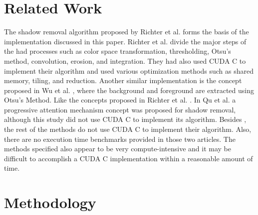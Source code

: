\documentclass[conference]{IEEEtran}
\begin{document}
   \section{Related Work}
      The shadow removal algorithm proposed by Richter et al. \cite{Akoglu} forms the basis of the implementation discussed in this paper. Richter et al. divide the major steps of the had processes such as color space transformation, thresholding, Otsu’s method, convolution, erosion, and integration. They had also used CUDA C to implement their algorithm and used various optimization methods such as shared memory, tiling, and reduction. Another similar implementation is the concept proposed in Wu et al. \cite{Wu2020}, where the background and foreground are extracted using Otsu’s Method. Like the concepts proposed in Richter et al. \cite{Akoglu}. In Qu et al. \cite{Qu2023} a progressive attention mechanism concept was proposed for shadow removal, although this study did not use CUDA C to implement its algorithm. Besides \cite{Akoglu}, the rest of the methods do not use CUDA C to implement their algorithm. Also, there are no execution time benchmarks provided in those two articles. The methods specified also appear to be very compute-intensive and it may be difficult to accomplish a CUDA C implementation within a reasonable amount of time.
   \section{Methodology}
\end{document}
